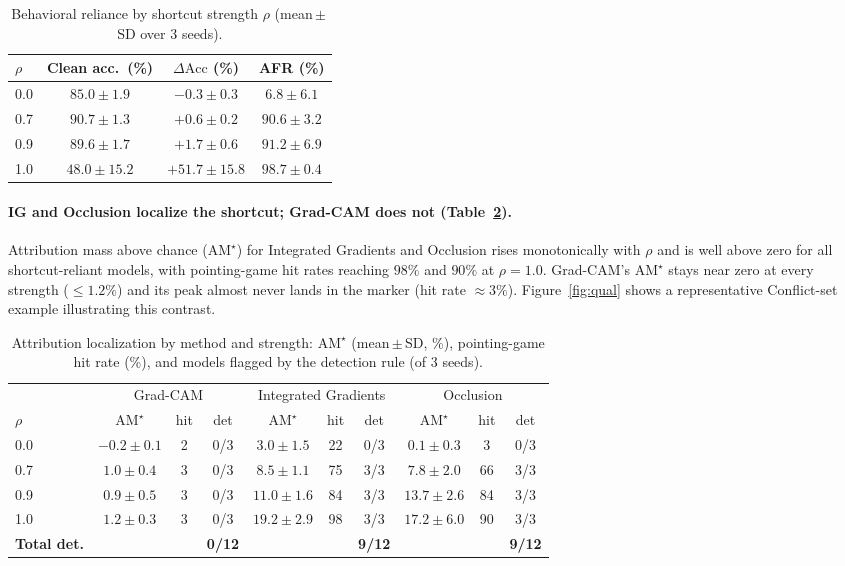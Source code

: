 \documentclass[11pt]{article}
\begin{document}
\begin{table}[t]
\centering
\caption{Behavioral reliance by shortcut strength $\rho$ (mean\,$\pm$\,SD over 3 seeds).}
\label{tab:behavior}
\begin{tabular}{lccc}
\toprule
$\rho$ & Clean acc.\ (\%) & $\Delta\mathrm{Acc}$ (\%) & AFR (\%) \\
\midrule
0.0 & $85.0\pm1.9$ & $-0.3\pm0.3$ & $6.8\pm6.1$ \\
0.7 & $90.7\pm1.3$ & $+0.6\pm0.2$ & $90.6\pm3.2$ \\
0.9 & $89.6\pm1.7$ & $+1.7\pm0.6$ & $91.2\pm6.9$ \\
1.0 & $48.0\pm15.2$ & $+51.7\pm15.8$ & $98.7\pm0.4$ \\
\bottomrule
\end{tabular}
\end{table}

\paragraph{IG and Occlusion localize the shortcut; Grad-CAM does not (Table~\ref{tab:xai}).}
Attribution mass above chance ($\mathrm{AM}^{\star}$) for Integrated Gradients and Occlusion rises
monotonically with $\rho$ and is well above zero for all shortcut-reliant models, with pointing-game
hit rates reaching $98\%$ and $90\%$ at $\rho=1.0$. Grad-CAM's $\mathrm{AM}^{\star}$ stays near zero
at every strength ($\leq 1.2\%$) and its peak almost never lands in the marker (hit rate $\approx
3\%$). Figure~\ref{fig:qual} shows a representative Conflict-set example illustrating this contrast.

\begin{table}[t]
\centering
\caption{Attribution localization by method and strength: $\mathrm{AM}^{\star}$ (mean\,$\pm$\,SD, \%),
pointing-game hit rate (\%), and models flagged by the detection rule (of 3 seeds).}
\label{tab:xai}
\begin{tabular}{lccc ccc ccc}
\toprule
 & \multicolumn{3}{c}{Grad-CAM} & \multicolumn{3}{c}{Integrated Gradients} & \multicolumn{3}{c}{Occlusion} \\
\cmidrule(lr){2-4}\cmidrule(lr){5-7}\cmidrule(lr){8-10}
$\rho$ & $\mathrm{AM}^{\star}$ & hit & det & $\mathrm{AM}^{\star}$ & hit & det & $\mathrm{AM}^{\star}$ & hit & det \\
\midrule
0.0 & $-0.2\pm0.1$ & 2  & 0/3 & $3.0\pm1.5$  & 22 & 0/3 & $0.1\pm0.3$  & 3  & 0/3 \\
0.7 & $1.0\pm0.4$  & 3  & 0/3 & $8.5\pm1.1$  & 75 & 3/3 & $7.8\pm2.0$  & 66 & 3/3 \\
0.9 & $0.9\pm0.5$  & 3  & 0/3 & $11.0\pm1.6$ & 84 & 3/3 & $13.7\pm2.6$ & 84 & 3/3 \\
1.0 & $1.2\pm0.3$  & 3  & 0/3 & $19.2\pm2.9$ & 98 & 3/3 & $17.2\pm6.0$ & 90 & 3/3 \\
\midrule
\multicolumn{1}{l}{\textbf{Total det.}} & & & \textbf{0/12} & & & \textbf{9/12} & & & \textbf{9/12} \\
\bottomrule
\end{tabular}
\end{table}
\end{document}
